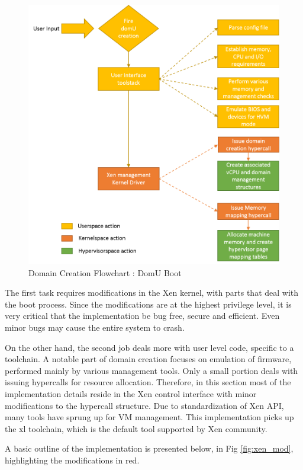 \begin{figure}[H]
\centering
\includegraphics[scale=0.9]{figures/domain_creation2.png}
\caption{Domain Creation Flowchart : DomU Boot}
\label{fig:dom_flowchart}
\end{figure}
The first task requires modifications in the Xen kernel, with parts that deal with the boot process. Since the modifications are at the highest privilege level, it is very critical that the implementation be bug free, secure and efficient. Even minor bugs may cause the entire system to crash.

On the other hand, the second job deals more with user level code, specific to a toolchain. A notable part of domain creation focuses on emulation of firmware, performed mainly by various management tools. Only a small portion deals with issuing hypercalls for resource allocation. Therefore, in this section most of the implementation details reside in the Xen control interface with minor modifications to the hypercall structure. Due to standardization of Xen API, many tools have sprung up for VM management. This implementation picks up the xl toolchain, which is the default tool supported by Xen community.

A basic outline of the implementation is presented below, in Fig \ref{fig:xen_mod}, highlighting the modifications in red.

